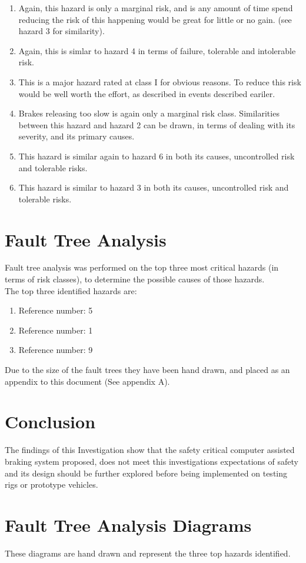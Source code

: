 \documentclass{article}
\begin{document}
\begin{enumerate}
\item Again, this hazard is only a marginal risk, and is any amount of time
	spend reducing the risk of this happening would be great for little or
	no gain. (see hazard 3 for similarity).

\item Again, this is simlar to hazard 4 in terms of failure, tolerable and
	intolerable risk.

\item This is a major hazard rated at class I for obvious reasons.  To reduce
	this risk would be well worth the effort, as described in events described 
	eariler.

\item Brakes releasing too slow is again only a marginal risk class.
	Similarities between this hazard and hazard 2 can be drawn, in terms
	of dealing with its severity, and its primary causes.

\item This hazard is similar again to hazard 6 in both its causes, uncontrolled
	risk and tolerable risks.

\item This hazard is similar to hazard 3 in both its causes, uncontrolled risk
	and tolerable risks.

\end{enumerate}

\newpage
\section{Fault Tree Analysis}

\noindent
Fault tree analysis was performed on the top three most critical
hazards (in terms of risk classes),  to determine the possible causes of those
hazards.\\

\noindent
The top three identified hazards are:
\begin{enumerate}
	\item Reference number: 5
	\item Reference number: 1
	\item Reference number: 9
\end{enumerate}

\noindent
Due to the size of the fault trees they have been hand drawn, and placed as 
an appendix to this document (See appendix A).\\

\newpage
\section{Conclusion}
The findings of this Investigation show that the safety critical computer assisted
braking system proposed, does not meet this investigations expectations of safety 
and its design should be further explored before being implemented on testing
rigs or prototype vehicles.\\

\newpage
\appendix
\section{Fault Tree Analysis Diagrams}
\noindent
These diagrams are hand drawn and represent the three top hazards identified. 
\end{document}
